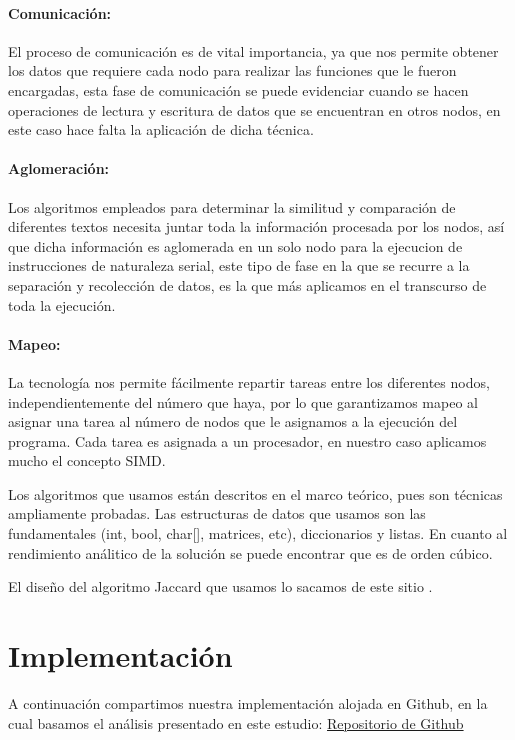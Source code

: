 \documentclass[fleqn,10pt]{SelfArx} %
\begin{document}
\paragraph{Comunicación:}
El proceso de comunicación es de vital importancia, ya que nos permite obtener los datos que requiere cada nodo para realizar las funciones que le fueron encargadas, esta fase de comunicación se puede evidenciar cuando se hacen operaciones de lectura y escritura de datos que se encuentran en otros nodos, en este caso hace falta la aplicación de dicha técnica.


\paragraph{Aglomeración:}
Los algoritmos empleados para determinar la similitud y comparación de diferentes textos necesita juntar toda la información procesada por los nodos, así que dicha información es aglomerada en un solo nodo para la ejecucion de instrucciones de naturaleza serial, este tipo de fase en la que se recurre a la separación y recolección de datos, es la que más aplicamos en el transcurso de toda la ejecución.

\paragraph{Mapeo:}
La tecnología nos permite fácilmente repartir tareas entre los diferentes nodos, independientemente del número que haya, por lo que garantizamos mapeo al asignar una tarea al número de nodos que le asignamos a la ejecución del programa. Cada tarea es asignada a un procesador, en nuestro caso aplicamos mucho el concepto SIMD.

Los algoritmos que usamos están descritos en el marco teórico, pues son técnicas ampliamente probadas.
Las estructuras de datos que usamos son las fundamentales (int, bool, char[], matrices, etc), diccionarios y listas.
En cuanto al rendimiento análitico de la solución se puede encontrar que es de orden cúbico.

El diseño del algoritmo Jaccard que usamos lo sacamos de este sitio \cite{jaccard_seudo}. 

\section{Implementación}

A continuación compartimos nuestra implementación alojada en Github, en la cual basamos el análisis presentado en este estudio: \href{https://github.com/jonyzp/HPC}{Repositorio de Github}
\end{document}
